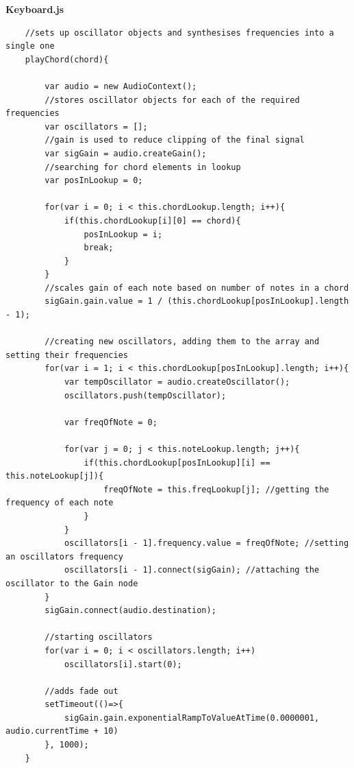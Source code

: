 \documentclass[12pt,a4paper]{article}
\begin{document}
		\textbf{Keyboard.js}\\
		\normalsize
	\begin{lstlisting}
	//sets up oscillator objects and synthesises frequencies into a single one
    playChord(chord){

        var audio = new AudioContext();
        //stores oscillator objects for each of the required frequencies
        var oscillators = [];
        //gain is used to reduce clipping of the final signal
        var sigGain = audio.createGain();
        //searching for chord elements in lookup
        var posInLookup = 0;

        for(var i = 0; i < this.chordLookup.length; i++){
            if(this.chordLookup[i][0] == chord){
                posInLookup = i;
                break;
            }
        }
        //scales gain of each note based on number of notes in a chord
        sigGain.gain.value = 1 / (this.chordLookup[posInLookup].length - 1);

        //creating new oscillators, adding them to the array and setting their frequencies
        for(var i = 1; i < this.chordLookup[posInLookup].length; i++){
            var tempOscillator = audio.createOscillator();
            oscillators.push(tempOscillator);

            var freqOfNote = 0;

            for(var j = 0; j < this.noteLookup.length; j++){
                if(this.chordLookup[posInLookup][i] == this.noteLookup[j]){
                    freqOfNote = this.freqLookup[j]; //getting the frequency of each note
                }
            }
            oscillators[i - 1].frequency.value = freqOfNote; //setting an oscillators frequency
            oscillators[i - 1].connect(sigGain); //attaching the oscillator to the Gain node
        }
        sigGain.connect(audio.destination);

        //starting oscillators
        for(var i = 0; i < oscillators.length; i++)
            oscillators[i].start(0);
        
        //adds fade out
        setTimeout(()=>{
            sigGain.gain.exponentialRampToValueAtTime(0.0000001, audio.currentTime + 10)
        }, 1000);
    }
\end{lstlisting}
\end{document}
